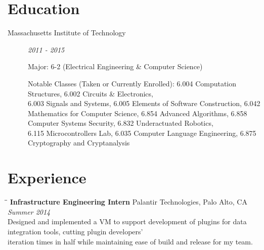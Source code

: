 \documentclass{res}
\begin{document}

	\address{
		Room 631D \\
		229 Vassar Street \\
		Cambridge, MA  02139
	}

	\address{
		\bf woursler.com \\
		woursler@mit.edu \\
		(541)-601-8295
	}

	\begin{resume}

		\vspace{-10pt}
		\section{Education}
			\begin{description}

				\item[Massachusetts Institute of Technology] \textit{2011 - 2015}

				Major: 6-2 (Electrical Engineering \& Computer Science)

				Notable Classes (Taken or Currently Enrolled):
				6.004 Computation Structures,
				6.002 Circuits \& Electronics,
				\\6.003 Signals and Systems,
				6.005 Elements of Software Construction,
				6.042 Mathematics for Computer Science,
				6.854 Advanced Algorithms,
				6.858 Computer Systems Security,
				6.832 Underactuated Robotics,
				\\6.115 Microcontrollers Lab,
				6.035 Computer Language Engineering,
				6.875 Cryptography and Cryptanalysis

			\end{description}

		\vspace{-20pt}
		\section{Experience}
			\vspace{-0.1in}

			\begin{tabbing}
				\hspace{2.3in}\= \hspace{2.6in}\= \kill %
				{\bf Infrastructure Engineering Intern} \>Palantir Technologies, Palo Alto, CA \> \textit{Summer 2014}
				\\Designed and implemented a VM to support development of plugins for data integration tools, cutting plugin developers'
				\\iteration times in half while maintaining ease of build and release for my team.
			\end{tabbing}\vspace{-20pt}


\end{resume}
\end{document}
